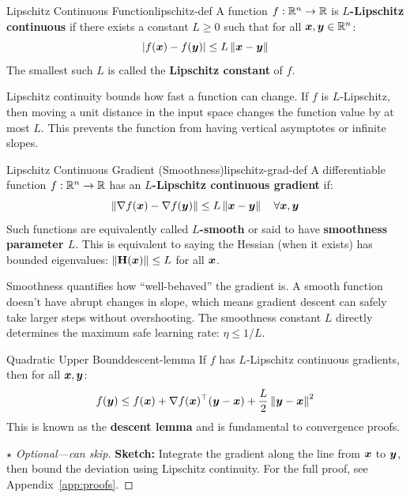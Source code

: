 \documentclass[../../main.tex]{subfiles}
\begin{document}
\begin{definition}{Lipschitz Continuous Function}{lipschitz-def}
A function $f: \mathbb{R}^n \to \mathbb{R}$ is \textbf{$L$-Lipschitz continuous} if there exists a constant $L \geq 0$ such that for all $\boldsymbol{x}, \boldsymbol{y} \in \mathbb{R}^n$:
\[
    |f(\boldsymbol{x}) - f(\boldsymbol{y})| \leq L \left\lVert \boldsymbol{x} - \boldsymbol{y} \right\rVert
\]
The smallest such $L$ is called the \textbf{Lipschitz constant} of $f$.
\end{definition}

\begin{intuition}
Lipschitz continuity bounds how fast a function can change. If $f$ is $L$-Lipschitz, then moving a unit distance in the input space changes the function value by at most $L$. This prevents the function from having vertical asymptotes or infinite slopes.
\end{intuition}

\begin{definition}{Lipschitz Continuous Gradient (Smoothness)}{lipschitz-grad-def}
A differentiable function $f: \mathbb{R}^n \to \mathbb{R}$ has an \textbf{$L$-Lipschitz continuous gradient} if:
\[
    \left\lVert \nabla f(\boldsymbol{x}) - \nabla f(\boldsymbol{y}) \right\rVert \leq L \left\lVert \boldsymbol{x} - \boldsymbol{y} \right\rVert \quad \forall \boldsymbol{x}, \boldsymbol{y}
\]
Such functions are equivalently called \textbf{$L$-smooth} or said to have \textbf{smoothness parameter $L$}. This is equivalent to saying the Hessian (when it exists) has bounded eigenvalues: $\left\lVert \mathbf{H}(\boldsymbol{x}) \right\rVert \leq L$ for all $\boldsymbol{x}$.

Smoothness quantifies how ``well-behaved'' the gradient is. A smooth function doesn't have abrupt changes in slope, which means gradient descent can safely take larger steps without overshooting. The smoothness constant $L$ directly determines the maximum safe learning rate: $\eta \leq 1/L$.
\end{definition}

\begin{theorem}{Quadratic Upper Bound}{descent-lemma}
If $f$ has $L$-Lipschitz continuous gradients, then for all $\boldsymbol{x}, \boldsymbol{y}$:
\[
    f(\boldsymbol{y}) \leq f(\boldsymbol{x}) + \nabla f(\boldsymbol{x})^\top (\boldsymbol{y} - \boldsymbol{x}) + \frac{L}{2}\left\lVert \boldsymbol{y} - \boldsymbol{x} \right\rVert^2
\]
This is known as the \textbf{descent lemma} and is fundamental to convergence proofs.
\end{theorem}

\begin{proof}[$\star$ Optional---can skip]
\textbf{Sketch:} Integrate the gradient along the line from $\boldsymbol{x}$ to $\boldsymbol{y}$, then bound the deviation using Lipschitz continuity. For the full proof, see Appendix~\ref{app:proofs}.
\end{proof}
\end{document}

